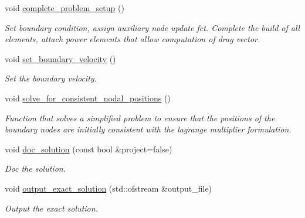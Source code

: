 \begin{DoxyCompactItemize}
void \hyperlink{classUnstructuredImmersedEllipseProblem_a42b13e3306ff2a94053907644ba17c8d}{complete\+\_\+problem\+\_\+setup} ()
\begin{DoxyCompactList}\small\item\em Set boundary condition, assign auxiliary node update fct. Complete the build of all elements, attach power elements that allow computation of drag vector. \end{DoxyCompactList}\item 
void \hyperlink{classUnstructuredImmersedEllipseProblem_ab201b187b240105fd8d444d943f6dada}{set\+\_\+boundary\+\_\+velocity} ()
\begin{DoxyCompactList}\small\item\em Set the boundary velocity. \end{DoxyCompactList}\item 
void \hyperlink{classUnstructuredImmersedEllipseProblem_a2a88b40ff1988de0fc696f1eb755ea54}{solve\+\_\+for\+\_\+consistent\+\_\+nodal\+\_\+positions} ()
\begin{DoxyCompactList}\small\item\em Function that solves a simplified problem to ensure that the positions of the boundary nodes are initially consistent with the lagrange multiplier formulation. \end{DoxyCompactList}\item 
void \hyperlink{classUnstructuredImmersedEllipseProblem_a08e12dd83c98f96e14e8152cc758d398}{doc\+\_\+solution} (const bool \&project=false)
\begin{DoxyCompactList}\small\item\em Doc the solution. \end{DoxyCompactList}\item 
void \hyperlink{classUnstructuredImmersedEllipseProblem_a29a232dfac18ea901332bebdc14fad15}{output\+\_\+exact\+\_\+solution} (std\+::ofstream \&output\+\_\+file)
\begin{DoxyCompactList}\small\item\em Output the exact solution. \end{DoxyCompactList}\end{DoxyCompactItemize}
